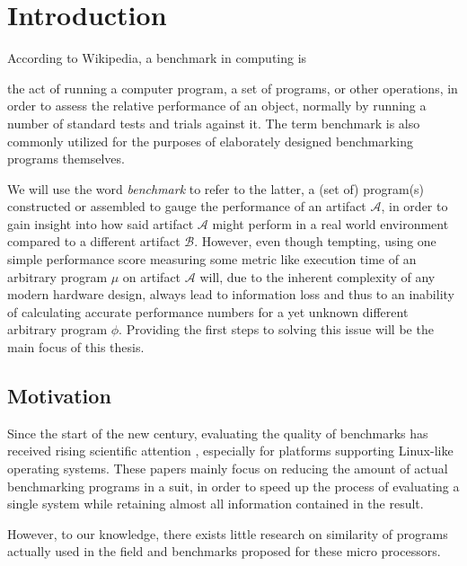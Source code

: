 \documentclass[../bachelor_paper.tex]{subfiles}
\begin{document}
\chapter{Introduction}
    \label{ch:intro}

According to Wikipedia, a benchmark in computing is
\begin{displayquote}
the act of running a computer program, a set of programs, or other operations, in order to assess the relative performance of an object, normally by running a number of standard tests and trials against it. The term benchmark is also commonly utilized for the purposes of elaborately designed benchmarking programs themselves. \cite{BenchmarkComputing2021}
\end{displayquote}
We will use the word \emph{benchmark} to refer to the latter, a (set of) program(s) constructed or assembled to gauge the performance of an artifact $\mathcal{A}$, in order to gain insight into how said artifact $\mathcal{A}$ might perform in a real world environment compared to a different artifact $\mathcal{B}$. However, even though tempting, using one simple performance score measuring some metric like execution time of an arbitrary program $\mu$ on artifact $\mathcal{A}$ will, due to the inherent complexity of any modern hardware design, always lead to information loss and thus to an inability of calculating accurate performance numbers for a yet unknown different arbitrary program $\phi$. Providing the first steps to solving this issue will be the main focus of this thesis.

\section{Motivation}
Since the start of the new century, evaluating the quality of benchmarks has received rising scientific attention \cite{eeckhoutDesigningComputerArchitecture2003,dujmovicEvolutionEvaluationSPEC1998,vandierendonckManyBenchmarksStress2004,phansalkarMeasuringProgramSimilarity2005,eeckhoutQuantifyingImpactInput2003}, especially for platforms supporting Linux-like operating systems. These papers mainly focus on reducing the amount of actual benchmarking programs in a suit, in order to speed up the process of evaluating a single system while retaining almost all information contained in the result. 

However, to our knowledge, there exists little research on similarity of programs actually used in the field and benchmarks proposed for these micro processors.
\end{document}
